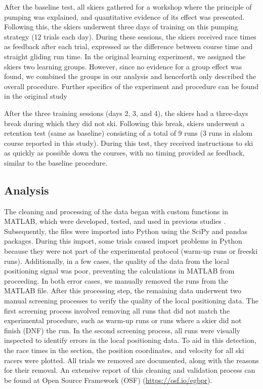 \documentclass{article}
\begin{document}
After the baseline test, all skiers gathered for a workshop where the principle of pumping was explained, and quantitative evidence of its effect was presented. Following this, the skiers underwent three days of training on this pumping strategy (12 trials each day). During these sessions, the skiers received race times as feedback after each trial, expressed as the difference between course time and straight gliding run time. In the original learning experiment, we assigned the skiers two learning groups. However, since no evidence for a group effect was found, we combined the groups in our analysis and henceforth only described the overall procedure.  Further specifics of the experiment and procedure can be found in the original study \cite{magelssen_is_2022}

After the three training sessions (days 2, 3, and 4), the skiers had a three-days break during which they did not ski. Following this break, skiers underwent a retention test (same as baseline) consisting of a total of 9 runs (3 runs in slalom course reported in this study). During this test, they received instructions to ski as quickly as possible down the courses, with no timing provided as feedback, similar to the baseline procedure.


\subsection{Analysis}
The cleaning and processing of the data began with custom functions in MATLAB, which were developed, tested, and used in previous studies \cite{reid_kinematic_2010}. Subsequently, the files were imported into Python using the SciPy \cite{virtanen_scipy_2020} and pandas \cite{mckinney_pandas-powerful_2015} packages. During this import, some trials caused import problems in Python because they were not part of the experimental protocol (warm-up runs or freeski runs). Additionally, in a few cases, the quality of the data from the local positioning signal was poor, preventing the calculations in MATLAB from proceeding. In both error cases, we manually removed the runs from the MATLAB file. After this processing step, the remaining data underwent two manual screening processes to verify the quality of the local positioning data. The first screening process involved removing all runs that did not match the experimental procedure, such as warm-up runs or runs where a skier did not finish (DNF) the run. In the second screening process, all runs were visually inspected to identify errors in the local positioning data. To aid in this detection, the race times in the section, the position coordinates, and velocity for all ski racers were plotted. All trials we removed are documented, along with the reasons for their removal. An extensive report of this cleaning and validation process can be found at Open Source Framework (OSF)  (\url{https://osf.io/egbpr}).
\end{document}
